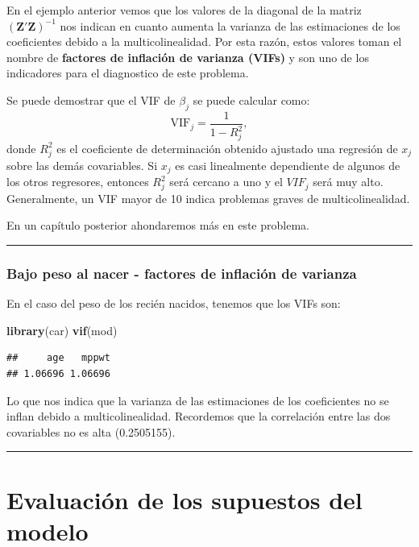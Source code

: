 \documentclass[
]{article}
\newenvironment{Shaded}{\begin{snugshade}}{\end{snugshade}}
\newcommand{\FunctionTok}[1]{\textcolor[rgb]{0.13,0.29,0.53}{\textbf{#1}}}
\newcommand{\NormalTok}[1]{#1}
\begin{document}
En el ejemplo anterior vemos que los valores de la diagonal de la matriz \((\boldsymbol Z'\boldsymbol Z)^{-1}\) nos indican en cuanto aumenta la varianza de las estimaciones de los coeficientes debido a la multicolinealidad. Por esta razón, estos valores toman el nombre de \textbf{factores de inflación de varianza (VIFs)} y son uno de los indicadores para el diagnostico de este problema.

Se puede demostrar que el VIF de \(\beta_{j}\) se puede calcular como:
\[
\mbox{VIF}_{j} = \frac{1}{1-R^{2}_{j}},
\]
donde \(R^{2}_{j}\) es el coeficiente de determinación obtenido ajustado una regresión de \(x_{j}\) sobre las demás covariables. Si \(x_{j}\) es casi linealmente dependiente de algunos de los otros regresores, entonces \(R^{2}_{j}\) será cercano a uno y el \(VIF_{j}\) será muy alto. Generalmente, un VIF mayor de 10 indica problemas graves de multicolinealidad.

En un capítulo posterior ahondaremos más en este problema.

\rule{\textwidth}{0.4pt}

\hypertarget{bajo-peso-al-nacer---factores-de-inflaciuxf3n-de-varianza}{%
\subsubsection{Bajo peso al nacer - factores de inflación de varianza}\label{bajo-peso-al-nacer---factores-de-inflaciuxf3n-de-varianza}}

En el caso del peso de los recién nacidos, tenemos que los VIFs son:

\begin{Shaded}
\begin{Highlighting}[]
\FunctionTok{library}\NormalTok{(car)}
\FunctionTok{vif}\NormalTok{(mod)}
\end{Highlighting}
\end{Shaded}

\begin{verbatim}
##     age   mppwt 
## 1.06696 1.06696
\end{verbatim}

Lo que nos indica que la varianza de las estimaciones de los coeficientes no se inflan debido a multicolinealidad. Recordemos que la correlación entre las dos covariables no es alta (0.2505155).

\rule{\textwidth}{0.4pt}

\hypertarget{evaluaciuxf3n-de-los-supuestos-del-modelo}{%
\section{Evaluación de los supuestos del modelo}\label{evaluaciuxf3n-de-los-supuestos-del-modelo}}
\end{document}

